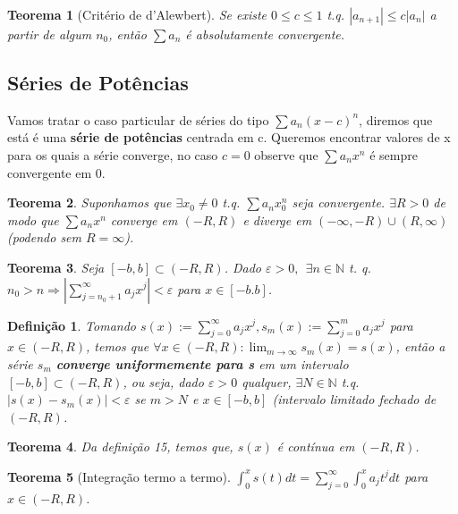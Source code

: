 \documentclass[12pt]{article}
\newtheorem{theorem}{Teorema}[section]
\newtheorem{definition}{Definição}
\begin{document}
\begin{theorem}[Critério de d'Alewbert]
    Se existe $0 \leq c \leq 1$ t.q. $|a_{n+1}| \leq c |a_n|$ a partir de algum $n_0$, então $\sum a_n$ é absolutamente convergente.
\end{theorem}

\subsection{Séries de Potências}
\label{s14}

Vamos tratar o caso particular de séries do tipo $\sum a_n (x-c)^n$, diremos que está é uma \textbf{série de potências} centrada em c. Queremos encontrar valores de x para os quais a série converge, no caso $c = 0$ observe que $\sum a_n x^n$ é sempre convergente em 0.

\begin{theorem}
    Suponhamos que $\exists x_0 \neq 0$ t.q. $\sum a_n x_0^n$ seja convergente. $\exists R > 0$ de modo que $\sum a_n x^n$ converge em $(-R, R)$ e diverge em $(- \infty, -R) \cup (R, \infty)$ (podendo sem $R = \infty$). 
\end{theorem}

\begin{theorem}
    Seja $[-b, b] \subset (-R, R)$. Dado $\varepsilon > 0, \ \ \exists n \in \mathbb{N}$ t. q. $n_0 > n \Rightarrow |\sum_{j = n_0 + 1}^\infty a_j x^j| < \varepsilon$ para $x \in [-b. b]$.
\end{theorem}

\begin{definition}
    Tomando $s(x):= \sum_{j=0}^\infty a_j x^j, s_m(x):= \sum_{j=0}^m a_j x^j$ para $x \in (-R, R)$, temos que $\forall x \in (-R, R): \lim_{m \rightarrow{} \infty} s_m(x) = s(x)$, então a série $s_m$ \textbf{converge uniformemente para s} em um intervalo $[-b, b] \subset (-R, R)$, ou seja, dado $\varepsilon > 0$ qualquer, $\exists N \in \mathbb{N}$ t.q. $|s(x) - s_m(x)| < \varepsilon$ se $m > N$ e $x \in [-b, b]$ (intervalo limitado fechado de $(-R, R)$.
\end{definition}

\begin{theorem}
    Da definição 15, temos que, $s(x)$ é contínua em $(-R, R)$.
\end{theorem}

\begin{theorem}[Integração termo a termo]
    $\int_0^x s(t) d t = \sum_{j=0}^\infty \int_0^x a_j t^j d t$ para $x \in (-R, R)$.
\end{theorem}
\end{document}
